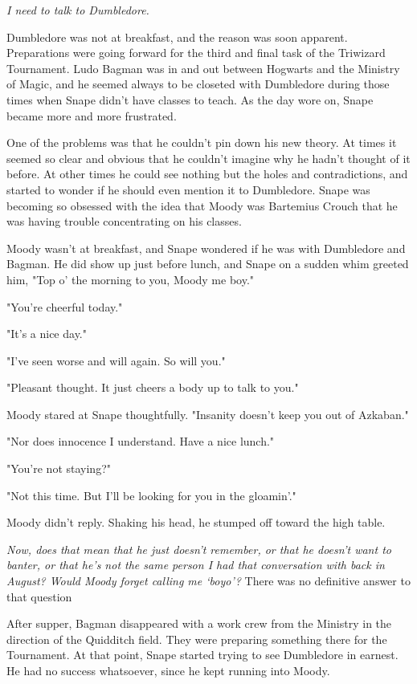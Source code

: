 \emph{I need to talk to Dumbledore.}

Dumbledore was not at breakfast, and the reason was soon apparent. Preparations were going forward for the third and final task of the Triwizard Tournament. Ludo Bagman was in and out between Hogwarts and the Ministry of Magic, and he seemed always to be closeted with Dumbledore during those times when Snape didn't have classes to teach. As the day wore on, Snape became more and more frustrated.

One of the problems was that he couldn't pin down his new theory. At times it seemed so clear and obvious that he couldn't imagine why he hadn't thought of it before. At other times he could see nothing but the holes and contradictions, and started to wonder if he should even mention it to Dumbledore. Snape was becoming so obsessed with the idea that Moody was Bartemius Crouch that he was having trouble concentrating on his classes.

Moody wasn't at breakfast, and Snape wondered if he was with Dumbledore and Bagman. He did show up just before lunch, and Snape on a sudden whim greeted him, "Top o' the morning to you, Moody me boy."

"You're cheerful today."

"It's a nice day."

"I've seen worse and will again. So will you."

"Pleasant thought. It just cheers a body up to talk to you."

Moody stared at Snape thoughtfully. "Insanity doesn't keep you out of Azkaban."

"Nor does innocence I understand. Have a nice lunch."

"You're not staying?"

"Not this time. But I'll be looking for you in the gloamin'."

Moody didn't reply. Shaking his head, he stumped off toward the high table.

\emph{Now, does that mean that he just doesn't remember, or that he doesn't want to banter, or that he's not the same person I had that conversation with back in August? Would Moody forget calling me `boyo'?} There was no definitive answer to that question

After supper, Bagman disappeared with a work crew from the Ministry in the direction of the Quidditch field. They were preparing something there for the Tournament. At that point, Snape started trying to see Dumbledore in earnest. He had no success whatsoever, since he kept running into Moody.

